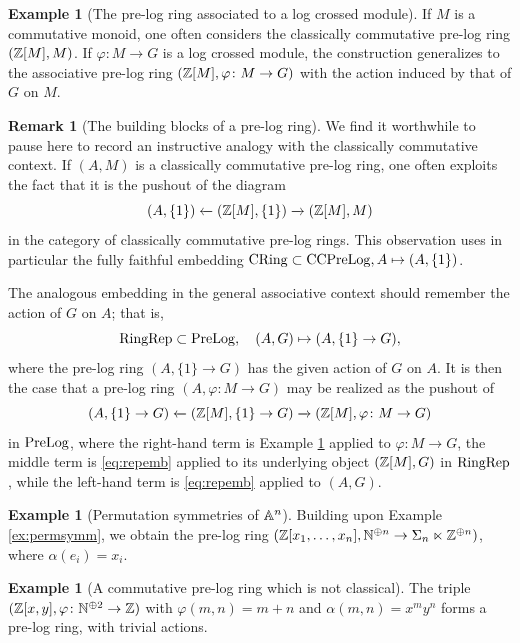 \documentclass[a4paper,10pt%
]{amsart}
\numberwithin{equation}{section}
\theoremstyle{definition}
\newtheorem{remark}[subsection]{Remark}
\newtheorem{example}[subsection]{Example}
\renewcommand{\:}{\colon}
\begin{document}
\begin{example}[The pre-log ring associated to a log crossed module]\label{ex:zm} If $M$ is a commutative monoid, one often considers the classically commutative pre-log ring $({\Bbb Z}[M], M)$. If $\varphi \colon M \to G$ is a log crossed module, the construction generalizes to the associative pre-log ring $({\Bbb Z}[M], \varphi \colon M \to G)$ with the action induced by that of $G$ on $M$. 
\end{example}

\begin{remark}[The building blocks of a pre-log ring] We find it worthwhile to pause here to record an instructive analogy with the classically commutative context. If $(A, M)$ is a classically commutative pre-log ring, one often exploits the fact that it is the pushout of the diagram \[(A, \{1\}) \xleftarrow{} ({\Bbb Z}[M], \{1\}) \xrightarrow{} ({\Bbb Z}[M], M)\] in the category of classically commutative pre-log rings. This observation uses in particular the fully faithful embedding ${\rm CRing} \subset {\rm CCPreLog}, A \mapsto (A, \{1\})$.  

The analogous embedding in the general associative context should remember the action of $G$ on $A$; that is, \begin{equation}\label{eq:repemb}{\rm RingRep} \subset {\rm PreLog}, \quad (A, G) \mapsto (A, \{1\} \to G),\end{equation} where the pre-log ring $(A, \{1\} \to G)$ has the given action of $G$ on $A$. It is then the case that a pre-log ring $(A, \varphi \colon M \to G)$ may be realized as the pushout of  \[(A, \{1\} \to G) \xleftarrow{} ({\Bbb Z}[M], \{1\} \to G) \xrightarrow{} ({\Bbb Z}[M], \varphi \colon M \to G)\] in ${\rm PreLog}$, where the right-hand term is Example \ref{ex:zm} applied to $\varphi \colon M \to G$, the middle term is \eqref{eq:repemb} applied to its underlying object $({\Bbb Z}[M], G)$ in ${\rm RingRep}$, while the left-hand term is \eqref{eq:repemb} applied to $(A, G)$.  
\end{remark}

\begin{example}[Permutation symmetries of ${\Bbb A}^n$] Building upon Example \ref{ex:permsymm}, we obtain the pre-log ring $({\Bbb Z}[x_1, \dots, x_n], {\Bbb N}^{\oplus n} \to \Sigma_n \ltimes {\Bbb Z}^{\oplus n})$, where $\alpha(e_i) = x_i$. 
\end{example}

\begin{example}[A commutative pre-log ring which is not classical]\label{ex:comm} The triple $({\Bbb Z}[x, y], \varphi \colon {\Bbb N}^{\oplus 2} \to {\Bbb Z})$ with $\varphi(m, n) = m + n$ and $\alpha(m, n) = x^my^n$ forms a pre-log ring, with trivial actions.
\end{example}
\end{document}
